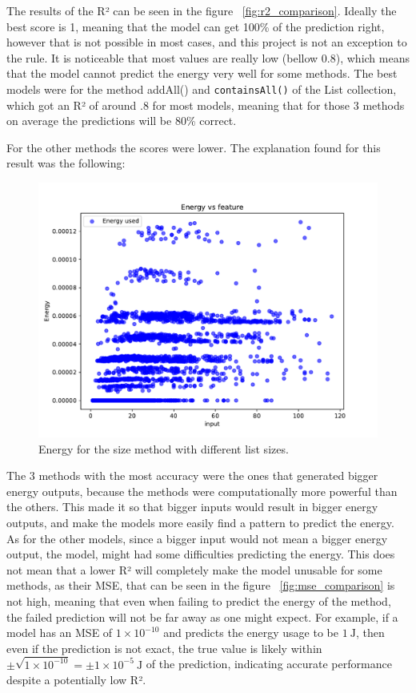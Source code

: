 The results of the R² can be seen in the figure ~\ref{fig:r2_comparison}.
Ideally the best score is 1, meaning that the model can get 100\% of the prediction right, however that is not possible in most cases, and this project is not an exception to the rule. It is noticeable that most values are really low (bellow 0.8), which means that the model cannot predict the energy very well for some methods. The best models were for the method {addAll()} and \texttt{containsAll()} of the List collection, which got an R² of around .8 for most models, meaning that for those 3 methods on average the predictions will be 80\% correct.

For the other methods the scores were lower. The explanation found for this result was the following:


\begin{figure}[htbp]
  \centering
  \includegraphics[width = .8 \textwidth]{figures/size_energy.pdf}
  \caption{Energy for the size method with different list sizes.}
  \label{fig:size_energy}
\end{figure}

The 3 methods with the most accuracy were the ones that generated bigger energy outputs, because the methods were computationally more powerful than the others. This made it so that bigger inputs would result in bigger energy outputs, and make the models more easily find a pattern to predict the energy. As for the other models, since a bigger input would not mean a bigger energy output, the model, might had some difficulties predicting the energy. This does not mean that a lower R² will completely make the model unusable for some methods, as their MSE, that can be seen in the figure ~\ref{fig:mse_comparison} is not high, meaning that even when failing to predict the energy of the method, the failed prediction will not be far away as one might expect. For example, if a model has an MSE of $1 \times 10^{-10}$ and predicts the energy usage to be $1~\mathrm{J}$, then even if the prediction is not exact, the true value is likely within $\pm \sqrt{1 \times 10^{-10}} = \pm 1 \times 10^{-5}~\mathrm{J}$ of the prediction, indicating accurate performance despite a potentially low R². 

